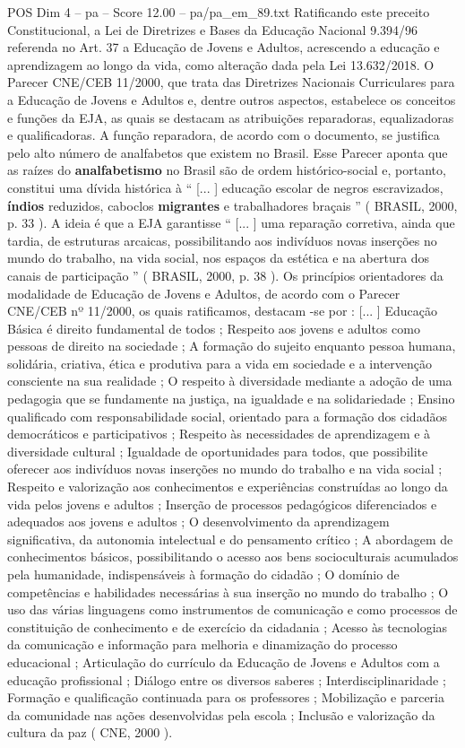 \begin{textsample}{POS Dim 4 – pa – Score 12.00 – pa/pa\_em\_89.txt}
Ratificando este preceito Constitucional, a Lei de Diretrizes e Bases da Educação Nacional 9.394/96 referenda no Art. 37 a Educação de Jovens e Adultos, acrescendo a educação e aprendizagem ao longo da vida, como alteração dada pela Lei 13.632/2018.
O Parecer CNE/CEB 11/2000, que trata das Diretrizes Nacionais Curriculares para a Educação de Jovens e Adultos e, dentre outros aspectos, estabelece os conceitos e funções da EJA, as quais se destacam as atribuições reparadoras, equalizadoras e qualificadoras.
A função reparadora, de acordo com o documento, se justifica pelo alto número de analfabetos que existem no Brasil.
Esse Parecer aponta que as raízes do \textbf{analfabetismo} no Brasil são de ordem histórico-social e, portanto, constitui uma dívida histórica à “ [... ] educação escolar de negros escravizados, \textbf{índios} reduzidos, caboclos \textbf{migrantes} e trabalhadores braçais ” ( BRASIL, 2000, p. 33 ).
A ideia é que a EJA garantisse “ [... ] uma reparação corretiva, ainda que tardia, de estruturas arcaicas, possibilitando aos indivíduos novas inserções no mundo do trabalho, na vida social, nos espaços da estética e na abertura dos canais de participação ” ( BRASIL, 2000, p. 38 ).
Os princípios orientadores da modalidade de Educação de Jovens e Adultos, de acordo com o Parecer CNE/CEB nº 11/2000, os quais ratificamos, destacam -se por : [... ] Educação Básica é direito fundamental de todos ; Respeito aos jovens e adultos como pessoas de direito na sociedade ; A formação do sujeito enquanto pessoa humana, solidária, criativa, ética e produtiva para a vida em sociedade e a intervenção consciente na sua realidade ; O respeito à diversidade mediante a adoção de uma pedagogia que se fundamente na justiça, na igualdade e na solidariedade ; Ensino qualificado com responsabilidade social, orientado para a formação dos cidadãos democráticos e participativos ; Respeito às necessidades de aprendizagem e à diversidade cultural ; Igualdade de oportunidades para todos, que possibilite oferecer aos indivíduos novas inserções no mundo do trabalho e na vida social ; Respeito e valorização aos conhecimentos e experiências construídas ao longo da vida pelos jovens e adultos ; Inserção de processos pedagógicos diferenciados e adequados aos jovens e adultos ; O desenvolvimento da aprendizagem significativa, da autonomia intelectual e do pensamento crítico ; A abordagem de conhecimentos básicos, possibilitando o acesso aos bens socioculturais acumulados pela humanidade, indispensáveis à formação do cidadão ; O domínio de competências e habilidades necessárias à sua inserção no mundo do trabalho ; O uso das várias linguagens como instrumentos de comunicação e como processos de constituição de conhecimento e de exercício da cidadania ; Acesso às tecnologias da comunicação e informação para melhoria e dinamização do processo educacional ; Articulação do currículo da Educação de Jovens e Adultos com a educação profissional ; Diálogo entre os diversos saberes ; Interdisciplinaridade ; Formação e qualificação continuada para os professores ; Mobilização e parceria da comunidade nas ações desenvolvidas pela escola ; Inclusão e valorização da cultura da paz ( CNE, 2000 ).

\end{textsample}
